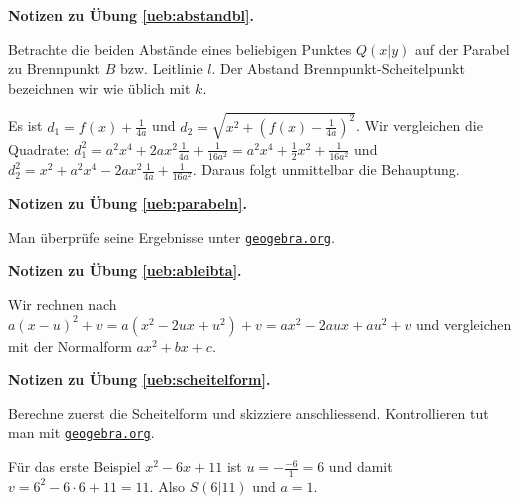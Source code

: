 \documentclass[%
11pt,%
twoside,%
titlepage,%
german,%
headsepline%
]{scrartcl}
\newcommand{\geogebralink}{\href{https://www.geogebra.org/calculator}{\texttt{geogebra.org}}}
\newcommand{\concatueb}[1]{ueb:#1}%
\newcommand{\concatlsg}[1]{lsg:#1}%
\newenvironment{lsg}[1]{%
    \par\noindent\textbf{Notizen zu Übung \ref{\concatueb{#1}}.}%
    \label{\concatlsg{#1}}
}{%
    \par%
}
\begin{document}
\begin{lsg}{abstandbl}
    Betrachte die beiden Abstände eines beliebigen Punktes $Q(x|y)$ auf der Parabel zu Brennpunkt $B$ bzw. Leitlinie $l$. Der Abstand Brennpunkt-Scheitelpunkt bezeichnen wir wie üblich mit $k$.

\begin{center}
\end{center}

Es ist
$d_1=f(x)+\frac{1}{4a}$ und $d_2=\sqrt{x^2+(f(x)-\frac{1}{4a})^2}$. Wir vergleichen die Quadrate:
$d_1^2=a^2x^4+2ax^2\frac{1}{4a}+\frac{1}{16a^2}=a^2x^4+\frac{1}{2}x^2+\frac{1}{16a^2}$
und
$d_2^2=x^2+a^2x^4-2ax^2\frac{1}{4a}+\frac{1}{16a^2}$. Daraus folgt unmittelbar die Behauptung.
\end{lsg}
\begin{lsg}{parabeln}
    Man überprüfe seine Ergebnisse unter \geogebralink.
\end{lsg}
\begin{lsg}{ableibta}
    Wir rechnen nach $a(x-u)^2+v=a(x^2-2ux+u^2)+v=ax^2-2aux+au^2+v$ und vergleichen mit der Normalform $ax^2+bx+c$.
\end{lsg}
\begin{lsg}{scheitelform}
    Berechne zuerst die Scheitelform und skizziere anschliessend. Kontrollieren tut man mit \geogebralink.
    
    Für das erste Beispiel $x^2-6x+11$ ist $u=-\frac{-6}{1}=6$ und damit $v=6^2-6\cdot6+11=11$. Also $S(6|11)$ und $a=1$.
\end{lsg}
\end{document}

